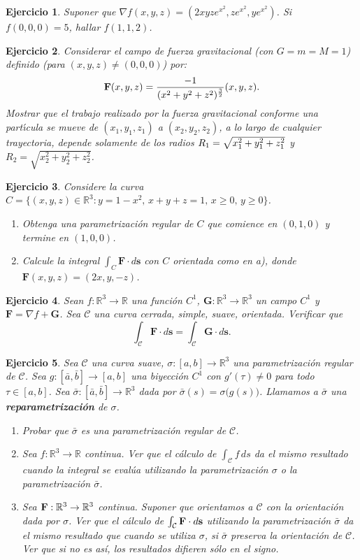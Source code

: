 \documentclass[11pt,a4paper,pdftex]{amsart}
\newtheorem{ej}{Ejercicio}%
\numberwithin{equation}{section}%
\newcommand{\bej}[1]{\begin{ej}\rm{#1}}
\newcommand{\eej}{\end{ej}\vspace{-0.2cm}}
\renewcommand{\bf}{\textbf}
\newcommand{\C}{\mathcal C}
\newcommand{\R}{\mathbb R}
\newcommand{\0}{\mathbb O}
\newcommand{\8}{\infty}
\begin{document}
\bej  Suponer que $\nabla f(x,y,z)=(2xyze^{x^2},ze^{x^2},ye^{x^2})$. Si $%
f(0,0,0)=5$, hallar $f(1,1,2)$.
\eej

\bej  Considerar el campo de fuerza gravitacional (con $G=m=M=1$) definido
(para $(x,y,z)\neq (0,0,0)$) por:
\[
{\bf F}(x,y,z)={\frac{-1}{(x^2+y^2+z^2)^{\frac 32}}}(x,y,z).
\]
Mostrar que el trabajo realizado por la fuerza gravitacional conforme una
part\'{\i }cula se mueve de $(x_1,y_1,z_1)$ a $(x_2,y_2,z_2)$, a lo largo de
cualquier trayectoria, depende solamente de los radios $R_1=\sqrt{%
x_1^2+y_1^2+z_1^2}$ y $R_2=\sqrt{x_2^2+y_2^2+z_2^2}$.
\eej

\bej
Considere la curva $C = \{(x, y, z) \in \mathbb{R}^3 : y = 1 - x^2, \, x + y + z = 1, \, x \geq 0, \, y \geq 0 \}$.

\begin{enumerate}
    \item[a)] Obtenga una parametrización regular de $C$ que comience en $(0, 1, 0)$ y termine en $(1, 0, 0)$.
    \item[b)] Calcule la integral $\int_C \mathbf{F} \cdot d\mathbf{s}$ con $C$ orientada como en a), donde $\mathbf{F}(x, y, z) = (2x, y, -z)$.
\end{enumerate}
\eej


\bej Sean $f:\R^3\to\R$ una función $C^1$,  $\textbf{G}:\R^3\to\R^3$ un campo $C^1$ y
$\textbf{F}=\nabla f+\textbf{G}$. Sea
$\C$ una curva cerrada, simple, suave, orientada. Verificar que
$$
\int_\C \textbf{F}\cdot d\textbf{s}=\int_\C \textbf{G}\cdot d\textbf{s}.
$$
\eej

\bej Sea $\C$ una curva suave, $\sigma:[a,b]\to\R^3$ una parametrización regular de $\C$. Sea $g:[\bar a,\bar b]\to[a,b]$
una biyección $C^1$ con $g'(\tau)\neq0$ para todo $\tau\in[a,b]$. Sea $\bar\sigma:[\bar a,\bar b]\to\R^3$  dada por
 $\bar\sigma(s)=\sigma\big(g(s)\big)$. Llamamos a $\bar
\sigma$ una \bf {reparametrización} de $\sigma$.
\begin{enumerate}
\item[a).] Probar que $\bar \sigma$ es una parametrización regular de $\C$.

\item[b).] Sea $f:\R^3\to \R$ continua. Ver que el cálculo de $\int_\C f\,ds$ da el mismo resultado cuando la integral
se evalúa utilizando la parametrización $\sigma$ o la parametrización $\bar\sigma$.

\item[c).] Sea ${\bf F}:\R^3\to\R^3$ continua. Suponer que orientamos a $\C$ con la orientación dada por $\sigma$. Ver que el
cálculo de $\int_\C {\bf F}\cdot d{\bf s}$ utilizando la parametrización $\bar\sigma$ da el mismo resultado que
cuando se utiliza $\sigma$, si
$\bar\sigma$ preserva la orientación de $\C$. Ver que si no es así, los resultados difieren sólo en el signo.

\end{enumerate}
\eej
\end{document}
